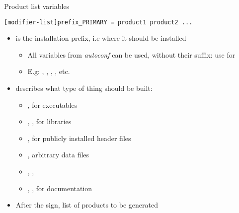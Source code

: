 \begin{frame}[fragile]{Product list variables}

    \begin{block}{}
{\small
\begin{verbatim}
[modifier-list]prefix_PRIMARY = product1 product2 ...
\end{verbatim}}
\end{block}

  \begin{itemize}

\item {} is the installation prefix, i.e where it should be
  installed
  \begin{itemize}
  \item All  variables from {\em autoconf} can be used,
    without their  suffix: use  for 
  \item E.g: , , ,
    , etc.
  \end{itemize}

\item {} describes what type of thing should be built:
  \begin{itemize}
  \item {}, for executables
  \item {}, , for libraries
  \item {}, for publicly installed header files
  \item {}, arbitrary data files
  \item {}, , 
  \item {}, , for documentation
  \end{itemize}

\item After the \code{=} sign, list of products to be generated

\end{itemize}

\end{frame}

